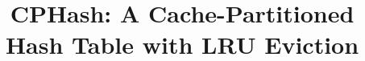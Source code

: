 \documentclass[10pt,twocolumn]{article}
\begin{document}
\newcommand{\cphash}{{\sc CPHash}}
\newcommand{\cpserver}{{\sc CPServer}}
\newcommand{\lockhash}{{\sc LockHash}}
\newcommand{\lockserver}{{\sc LockServer}}
\newcommand{\memcached}{{\sc Memcached}}

\title{\cphash: A Cache-Partitioned Hash Table with LRU Eviction}
\author{}
\date{}
\maketitle










\end{document}
